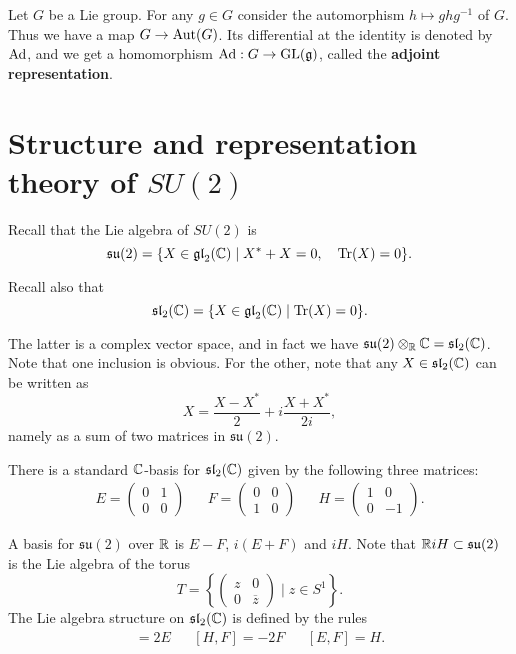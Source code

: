 \documentclass[11pt, english]{article}
\begin{document}
Let $G$ be a Lie group. For any $g \in G$ consider the automorphism $h \mapsto ghg^{-1}$ of $G$. Thus we have a map $G \to \operatorname{Aut}(G)$. Its differential at the identity is denoted by $\operatorname{Ad}$, and we get a homomorphism $\operatorname{Ad}:G \to \operatorname{GL}(\mathfrak g)$, called the \textbf{adjoint representation}.


\newpage
\section{Structure and representation theory of $SU(2)$}

Recall that the Lie algebra of $SU(2)$ is
$$
\mathfrak{su}(2) = \{ X \in \mathfrak{gl}_2(\mathbb{C}) \mid X^\ast + X = 0, \quad \operatorname{Tr}(X) = 0\} .
$$

Recall also that
$$
\mathfrak{sl}_2(\mathbb{C}) = \{ X \in \mathfrak{gl}_2(\mathbb{C}) \mid \operatorname{Tr}(X) = 0 \}.
$$

The latter is a complex vector space, and in fact we have $\mathfrak{su}(2) \otimes_{\mathbb{R}} \mathbb{C} = \mathfrak{sl}_2(\mathbb{C})$. Note that one inclusion is obvious. For the other, note that any $X \in \mathfrak{sl}_2(\mathbb{C})$ can be written as 
$$
X = \frac{X-X^\ast}{2} + i \frac{X+X^\ast}{2i},
$$
namely as a sum of two matrices in $\mathfrak{su}(2)$. 

There is a standard $\mathbb{C}$-basis for $\mathfrak{sl}_2(\mathbb{C})$ given by the following three matrices:
\begin{align*}
E = \begin{pmatrix}
0 & 1 \\
0 & 0 
\end{pmatrix} &&
F = \begin{pmatrix} 
0 & 0 \\
1 & 0 
\end{pmatrix} &&
H = \begin{pmatrix}
1 & 0 \\
0 & - 1
\end{pmatrix}.
\end{align*}

A basis for $\mathfrak{su}(2)$ over $\mathbb{R}$ is $E-F$, $i(E+F)$ and $iH$. Note that $\mathbb{R} i H \subset \mathfrak{su}(2)$ is the Lie algebra of the torus 
$$
T = \left\{ \begin{pmatrix}
z & 0 \\
0 & \overline z 
\end{pmatrix} \mid z \in S^1
\right\}.
$$
The Lie algebra structure on $\mathfrak{sl}_2(\mathbb{C})$ is defined by the rules
\begin{align*}
[H,E] = 2E && [H,F] = -2F && [E,F] = H.
\end{align*}
\end{document}
